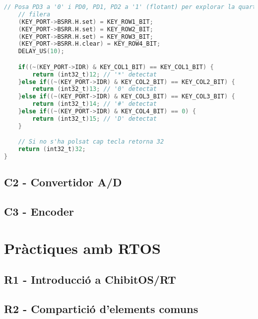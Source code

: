 \documentclass{report}
\begin{document}
\begin{lstlisting}[language=C]
    // Posa PD3 a '0' i PD0, PD1, PD2 a '1' (flotant) per explorar la quarta
    // filera
    (KEY_PORT->BSRR.H.set) = KEY_ROW1_BIT;
    (KEY_PORT->BSRR.H.set) = KEY_ROW2_BIT;
    (KEY_PORT->BSRR.H.set) = KEY_ROW3_BIT;
    (KEY_PORT->BSRR.H.clear) = KEY_ROW4_BIT;
    DELAY_US(10);

    if((~(KEY_PORT->IDR) & KEY_COL1_BIT) == KEY_COL1_BIT) {
        return (int32_t)12; // '*' detectat
    }else if((~(KEY_PORT->IDR) & KEY_COL2_BIT) == KEY_COL2_BIT) {
        return (int32_t)13; // '0' detectat
    }else if((~(KEY_PORT->IDR) & KEY_COL3_BIT) == KEY_COL3_BIT) {
        return (int32_t)14; // '#' detectat
    }else if((~(KEY_PORT->IDR) & KEY_COL4_BIT) == 0) {
        return (int32_t)15; // 'D' detectat
    }

    // Si no s'ha polsat cap tecla retorna 32
    return (int32_t)32;
}\end{lstlisting}

    \section{C2 - Convertidor A/D}
    \section{C3 - Encoder}
    \chapter{Pràctiques amb RTOS}
    \section{R1 - Introducció a ChibitOS/RT}
    \section{R2 - Compartició d'elements comuns}
\end{document}
